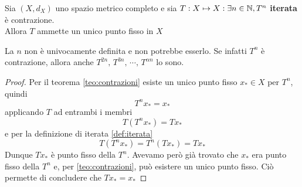 \begin{theorem}
	\label{teo:teo_iterata_contraz}
	Sia $(X,d_X)$ uno spazio metrico completo e sia $T:X\mapsto X : \exists n \in \mathbb{N}, T^n$ \textbf{iterata} è contrazione.\\
	Allora $T$ ammette un unico punto fisso in $X$
	\begin{note}
		La $n$ non è univocamente definita e non potrebbe esserlo. Se infatti $T^n$ è contrazione, allora anche $T^{2n},\, T^{3n},\, \cdots,\, T^{\alpha n}$ lo sono.
	\end{note}
	\begin{proof}
		Per il teorema \ref{teo:contrazioni} esiste un unico punto fisso $x_* \in X$ per $T^n$, quindi
		$$T^nx_* = x_*$$
		applicando $T$ ad entrambi i membri
		$$T(T^{n}x_*) = Tx_*$$
		e per la definizione di iterata \ref{def:iterata}
		$$T(T^{n}x_*) = T^n(Tx_*) = Tx_*$$
		Dunque $Tx_*$ è punto fisso della $T^n$. Avevamo però già trovato che $x_*$ era punto fisso della $T^n$ e, per \ref{teo:contrazioni}, può esistere un unico punto fisso. Ciò permette di concludere che $Tx_* = x_*$
	\end{proof}
\end{theorem}
